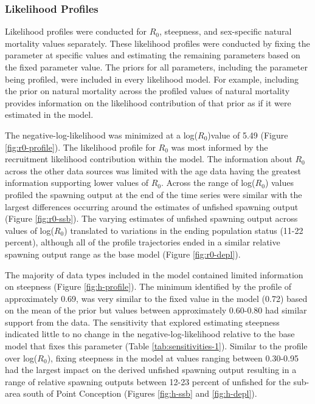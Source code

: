 \documentclass[11pt,
  english,
  letterpaper,
]{article}
\begin{document}
\hypertarget{likelihood-profiles}{%
\subsubsection{Likelihood Profiles}\label{likelihood-profiles}}

Likelihood profiles were conducted for \(R_0\), steepness, and sex-specific natural mortality values separately. These likelihood profiles were conducted by fixing the parameter at specific values and estimating the remaining parameters based on the fixed parameter value. The priors for all parameters, including the parameter being profiled, were included in every likelihood model. For example, including the prior on natural mortality across the profiled values of natural mortality provides information on the likelihood contribution of that prior as if it were estimated in the model.

The negative-log-likelihood was minimized at a log(\(R_0\))value of 5.49 (Figure \ref{fig:r0-profile}). The likelihood profile for \(R_0\) was most informed by the recruitment likelihood contribution within the model. The information about \(R_0\) across the other data sources was limited with the age data having the greatest information supporting lower values of \(R_0\). Across the range of log(\(R_0\)) values profiled the spawning output at the end of the time series were similar with the largest differences occurring around the estimates of unfished spawning output (Figure \ref{fig:r0-ssb}). The varying estimates of unfished spawning output across values of log(\(R_0\)) translated to variations in the ending population status (11-22 percent), although all of the profile trajectories ended in a similar relative spawning output range as the base model (Figure \ref{fig:r0-depl}).

The majority of data types included in the model contained limited information on steepness (Figure \ref{fig:h-profile}). The minimum identified by the profile of approximately 0.69, was very similar to the fixed value in the model (0.72) based on the mean of the prior but values between approximately 0.60-0.80 had similar support from the data. The sensitivity that explored estimating steepness indicated little to no change in the negative-log-likelihood relative to the base model that fixes this parameter (Table \ref{tab:sensitivities-1}). Similar to the profile over log(\(R_0\)), fixing steepness in the model at values ranging between 0.30-0.95 had the largest impact on the derived unfished spawning output resulting in a range of relative spawning outputs between 12-23 percent of unfished for the sub-area south of Point Conception (Figures \ref{fig:h-ssb} and \ref{fig:h-depl}).
\end{document}
